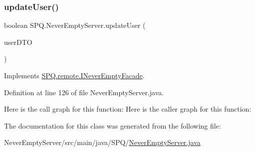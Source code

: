 \subsubsection{\texorpdfstring{update\+User()}{updateUser()}}
{\footnotesize\ttfamily boolean S\+P\+Q.\+Never\+Empty\+Server.\+update\+User (\begin{DoxyParamCaption}\item[{\mbox{\hyperlink{class_s_p_q_1_1dto_1_1_user_d_t_o}{User\+D\+TO}}}]{user\+D\+TO }\end{DoxyParamCaption})}



Implements \mbox{\hyperlink{interface_s_p_q_1_1remote_1_1_i_never_empty_facade_add6dafb25f59c549e924c76c6e8f31c6}{S\+P\+Q.\+remote.\+I\+Never\+Empty\+Facade}}.



Definition at line 126 of file Never\+Empty\+Server.\+java.

Here is the call graph for this function\+:
Here is the caller graph for this function\+:


The documentation for this class was generated from the following file\+:\begin{DoxyCompactItemize}
\item 
Never\+Empty\+Server/src/main/java/\+S\+P\+Q/\mbox{\hyperlink{_never_empty_server_8java}{Never\+Empty\+Server.\+java}}\end{DoxyCompactItemize}
